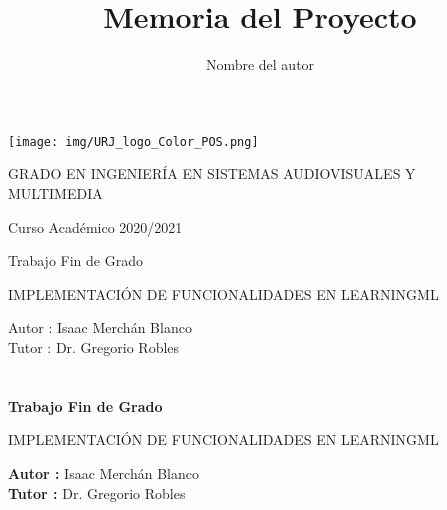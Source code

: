 \documentclass[a4paper, 12pt]{book}
\title{Memoria del Proyecto}
\author{Nombre del autor}
\begin{document}
\renewcommand{\refname}{Bibliografía}  %
\renewcommand{\appendixname}{Apéndice}


\begin{titlepage}
\begin{center}
\texttt{[image: img/URJ\_logo\_Color\_POS.png]}

\vspace{1.75cm}

\Large
GRADO EN INGENIERÍA EN SISTEMAS AUDIOVISUALES Y MULTIMEDIA

\vspace{0.4cm}

\large
Curso Académico 2020/2021

\vspace{0.8cm}

Trabajo Fin de Grado

\vspace{2.5cm}

\LARGE
IMPLEMENTACIÓN DE FUNCIONALIDADES EN LEARNINGML

\vspace{4cm}

\large
Autor : Isaac Merchán Blanco\\
Tutor : Dr. Gregorio Robles
\end{center}
\end{titlepage}

\newpage
\mbox{}
\thispagestyle{empty} %


\clearpage
{}
\chapter*{}

\vspace{-4cm}
\begin{center}
\LARGE
\textbf{Trabajo Fin de Grado}

\vspace{1cm}
\large
IMPLEMENTACIÓN DE FUNCIONALIDADES EN LEARNINGML

\vspace{1cm}
\large
\textbf{Autor :} Isaac Merchán Blanco \\
\textbf{Tutor :} Dr. Gregorio Robles

\end{center}
\end{document}
